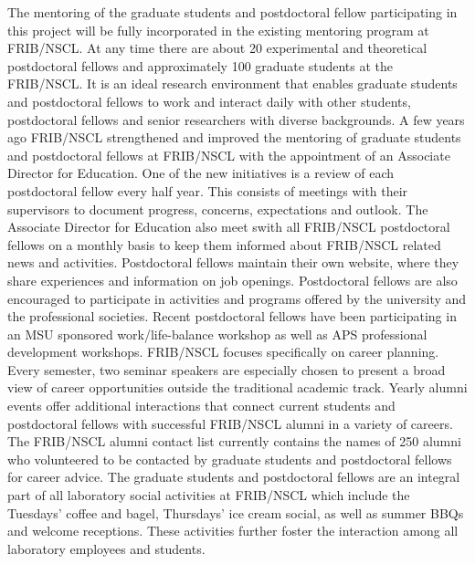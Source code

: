 \documentclass[11pt]{article}
\begin{document}
The mentoring of the graduate students and postdoctoral fellow 
participating in this project will be fully incorporated in the existing
mentoring program at FRIB/NSCL. At any time there are about 20
experimental and theoretical postdoctoral fellows and approximately 100 graduate
students at the FRIB/NSCL. It is an ideal research environment that enables
graduate students and postdoctoral fellows to work and interact daily
with other students, postdoctoral fellows and senior researchers with diverse
backgrounds. 
A few years ago FRIB/NSCL strengthened
and improved the mentoring of graduate students and postdoctoral fellows at
FRIB/NSCL with the appointment of an Associate Director for
Education. One of the new initiatives is a review of each postdoctoral
fellow every half year.  This consists of meetings with their supervisors to 
document progress, concerns, expectations and outlook. The Associate Director for 
Education also meet swith all FRIB/NSCL postdoctoral fellows on a monthly basis to keep them informed
about FRIB/NSCL related news and activities. Postdoctoral fellows maintain their own website, 
where they share experiences and information on job openings. Postdoctoral fellows are
also encouraged to participate in activities and programs offered by
the university and the professional societies. Recent
postdoctoral fellows have been participating in an MSU sponsored work/life-balance
workshop as well as APS professional development workshops. FRIB/NSCL
focuses specifically on career planning. Every semester, two seminar
speakers are especially chosen to present a broad view of career
opportunities outside the traditional academic track. Yearly alumni
events offer additional interactions that connect current students and postdoctoral fellows
with successful FRIB/NSCL alumni in a variety of careers.  The FRIB/NSCL
alumni contact list currently contains the names of 250 alumni who
volunteered to be contacted by graduate students and postdoctoral fellows for career advice. The
graduate students and postdoctoral fellows are an integral part of all laboratory social 
activities at FRIB/NSCL which include the Tuesdays' coffee and bagel, Thursdays' ice
cream social, as well as summer BBQs and welcome receptions. These
activities further foster the interaction among all laboratory employees and students.
\end{document}
